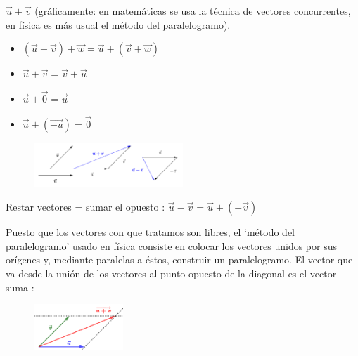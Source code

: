 	$\vec u \pm \vec v$  (gráficamente: en matemáticas se usa la técnica de vectores concurrentes, en física es más usual el método del paralelogramo).
	\begin{multicols}{2}
	
	\begin{itemize}
		\item $(\vec u + \vec v)+ \vec w=\vec u+(\vec v + \vec w)$
		\vspace{-2mm}\item $\vec u + \vec v= \vec v+ \vec u$
		\vspace{-2mm}\item $\vec u+ \vec 0=\vec u$
		\vspace{-2mm}\item $\vec u+ (\overrightarrow {-u})=\vec 0$
	\end{itemize}
	\begin{figure}[H]
		\centering
		\includegraphics[width=0.5\textwidth]{imagenes/imagenescv/T10IM03.png}
	\end{figure}
	\end{multicols}
	Restar vectores = sumar el opuesto : $\vec u - \vec v = \vec u +(-\vec v)$

\begin{multicols}{2}
	\scriptsize{Puesto que los vectores con que tratamos son libres, el `método del paralelogramo' usado en física consiste en colocar los vectores unidos por sus orígenes y, mediante paralelas a éstos, construir un paralelogramo. El vector que va desde la unión de los vectores al punto opuesto de la diagonal es el vector suma}  \normalsize{:}

	\begin{figure}[H]
	\centering
	\includegraphics[width=0.3\textwidth]{imagenes/imagenescv/T10IM14.png}
	\end{figure}
\end{multicols}

